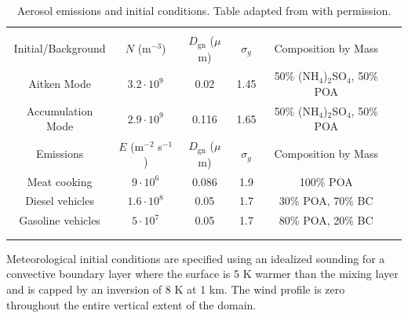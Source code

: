 \documentclass[journal abbreviation, manuscript]{copernicus}
\begin{document}
\begin{table}[!t]
\centering
\caption{Aerosol emissions and initial conditions. Table adapted from \citet{riemer_simulating_2009} with permission.}
\begin{tabular*}{\linewidth}{@{\extracolsep{\fill}} cccccc}
\\[-2ex]\hline 
     \hline \\[-2ex] Initial/Background  & $N$ (m$^{-3}$) & $D_{\text{gn}}$ ($\mu$m) & $\sigma_g$ & Composition by Mass\\
 \midrule
Aitken Mode & $3.2 \cdot 10^9$ & 0.02 & 1.45 & 50\% (NH$_4$)$_2$SO$_4$, 50\% POA\\
Accumulation Mode & $2.9 \cdot 10^9$ & 0.116 & 1.65 & 50\% (NH$_4$)$_2$SO$_4$, 50\% POA\\
\midrule
Emissions & $E$ (m$^{-2}$ s$^{-1}$) & $D_{\text{gn}}$ ($\mu$m) & $\sigma_g$ & Composition by Mass\\
\midrule
Meat cooking & $9 \cdot 10^6$ & 0.086 & 1.9 & 100\% POA\\
Diesel vehicles & $1.6 \cdot 10^8$ & 0.05 & 1.7 & 30\% POA, 70\% BC \\
Gasoline vehicles & $5 \cdot 10^7$ & 0.05 & 1.7 & 80\% POA, 20\% BC \\
\\[-2ex]\hline 
     \hline \\[-2ex]
\end{tabular*}
\label{table:aero_emiss_ics}
\end{table}


Meteorological initial conditions are specified using an idealized sounding for a convective boundary layer where the surface is 5 K warmer than the mixing layer and is capped by an inversion of 8 K at 1 km. %
The wind profile is zero throughout the entire vertical extent of the domain.

\end{document}
